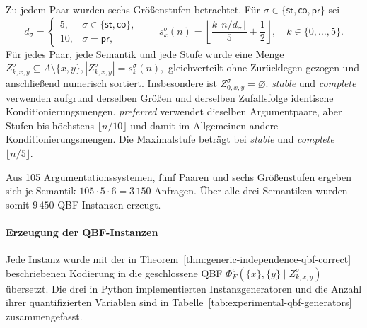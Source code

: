 Zu jedem Paar wurden sechs Größenstufen betrachtet. Für
\(\sigma\in\{\mathsf{st},\mathsf{co},\mathsf{pr}\}\) sei
\[
    d_\sigma=
    \begin{cases}
        5,  & \sigma\in\{\mathsf{st},\mathsf{co}\},\\
        10, & \sigma=\mathsf{pr},
    \end{cases}
    \qquad
    s_k^\sigma(n)=
    \left\lfloor
        \frac{k\lfloor n/d_\sigma\rfloor}{5}+\frac{1}{2}
    \right\rfloor,
    \quad k\in\{0,\ldots,5\}.
\]
Für jedes Paar, jede Semantik und jede Stufe wurde eine Menge
\(
    Z_{k,x,y}^{\sigma}\subseteq A\setminus\{x,y\},
    |Z_{k,x,y}^{\sigma}|=s_k^\sigma(n),
\)
gleichverteilt ohne Zurücklegen gezogen und anschließend numerisch
sortiert. Insbesondere ist \(Z_{0,x,y}^{\sigma}=\varnothing\). \emph{stable} und \emph{complete}
verwenden aufgrund derselben Größen und derselben Zufallsfolge identische
Konditionierungsmengen. \emph{preferred} verwendet dieselben Argumentpaare, aber
Stufen bis höchstens \(\lfloor n/10\rfloor\) und damit im Allgemeinen
andere Konditionierungsmengen. Die Maximalstufe beträgt bei \emph{stable} und
\emph{complete} \(\lfloor n/5\rfloor\).

Aus 105 Argumentationssystemen, fünf Paaren und sechs Größenstufen ergeben
sich je Semantik
\(
    105\cdot5\cdot6=3\,150
\)
Anfragen. Über alle drei Semantiken wurden somit \(9\,450\) QBF-Instanzen
erzeugt.

\paragraph{Erzeugung der QBF-Instanzen}
\label{subsec:qbf-generation}

Jede Instanz wurde mit der in
Theorem~\ref{thm:generic-independence-qbf-correct} beschriebenen Kodierung
in die geschlossene QBF
\(
    \Phi_F^\sigma(\{x\},\{y\}\mid Z_{k,x,y}^{\sigma})
\)
übersetzt. Die drei in Python implementierten Instanzgeneratoren und die
Anzahl ihrer quantifizierten Variablen sind in
Tabelle~\ref{tab:experimental-qbf-generators} zusammengefasst.

